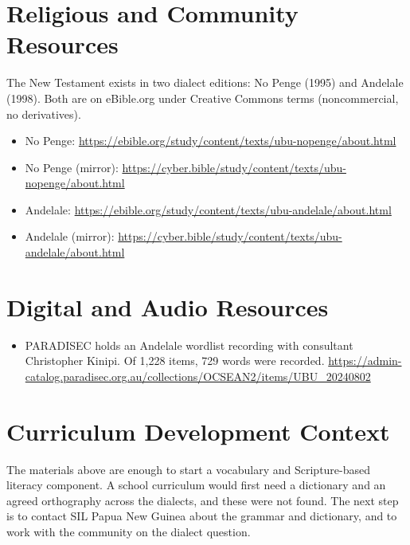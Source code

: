 \documentclass[12pt]{article}
\begin{document}
\section{Religious and Community Resources}
The New Testament exists in two dialect editions: No Penge (1995) and Andelale (1998). Both are on eBible.org under Creative Commons terms (noncommercial, no derivatives).
\begin{itemize}
\item No Penge: \url{https://ebible.org/study/content/texts/ubu-nopenge/about.html}
\item No Penge (mirror): \url{https://cyber.bible/study/content/texts/ubu-nopenge/about.html}
\item Andelale: \url{https://ebible.org/study/content/texts/ubu-andelale/about.html}
\item Andelale (mirror): \url{https://cyber.bible/study/content/texts/ubu-andelale/about.html}
\end{itemize}

\section{Digital and Audio Resources}
\begin{itemize}
\item PARADISEC holds an Andelale wordlist recording with consultant Christopher Kinipi. Of 1,228 items, 729 words were recorded. \url{https://admin-catalog.paradisec.org.au/collections/OCSEAN2/items/UBU_20240802}
\end{itemize}

\section{Curriculum Development Context}
The materials above are enough to start a vocabulary and Scripture-based literacy component. A school curriculum would first need a dictionary and an agreed orthography across the dialects, and these were not found. The next step is to contact SIL Papua New Guinea about the grammar and dictionary, and to work with the community on the dialect question.
\end{document}

